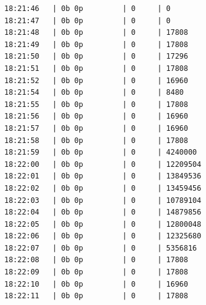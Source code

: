 \documentclass[12pt,a4paper,twoside]{book}
\begin{document}
\begin{onehalfspace}
\begin{lstlisting}
18:21:46   | 0b 0p         | 0     | 0
18:21:47   | 0b 0p         | 0     | 0
18:21:48   | 0b 0p         | 0     | 17808
18:21:49   | 0b 0p         | 0     | 17808
18:21:50   | 0b 0p         | 0     | 17296
18:21:51   | 0b 0p         | 0     | 17808
18:21:52   | 0b 0p         | 0     | 16960
18:21:54   | 0b 0p         | 0     | 8480
18:21:55   | 0b 0p         | 0     | 17808
18:21:56   | 0b 0p         | 0     | 16960
18:21:57   | 0b 0p         | 0     | 16960
18:21:58   | 0b 0p         | 0     | 17808
18:21:59   | 0b 0p         | 0     | 4240000
18:22:00   | 0b 0p         | 0     | 12209504
18:22:01   | 0b 0p         | 0     | 13849536
18:22:02   | 0b 0p         | 0     | 13459456
18:22:03   | 0b 0p         | 0     | 10789104
18:22:04   | 0b 0p         | 0     | 14879856
18:22:05   | 0b 0p         | 0     | 12800048
18:22:06   | 0b 0p         | 0     | 12325680
18:22:07   | 0b 0p         | 0     | 5356816
18:22:08   | 0b 0p         | 0     | 17808
18:22:09   | 0b 0p         | 0     | 17808
18:22:10   | 0b 0p         | 0     | 16960
18:22:11   | 0b 0p         | 0     | 17808
\end{lstlisting}
\begin{figure}[H]
    \centering
\end{figure}
\end{onehalfspace}
\end{document}

